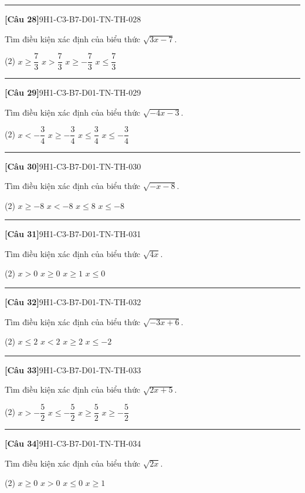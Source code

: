 \documentclass[12pt,a4paper]{article}
\newif\ifloigiai
\newenvironment{cauhoi}[2]{%
  \par\medskip\noindent\rule{\textwidth}{0.4pt}\par\nopagebreak
  \noindent\textbf{[#1]}\hfill{\scriptsize\ttfamily #2}\par\nopagebreak\smallskip}{\par}
\newcommand{\dapan}[1]{\ifloigiai\par\smallskip\noindent\textit{Đáp án:} \textbf{#1}\par\fi}
\begin{document}
\begin{cauhoi}{Câu 28}{9H1-C3-B7-D01-TN-TH-028}
Tìm điều kiện xác định của biểu thức $\sqrt{3x - 7}$.
\begin{tasks}(2)
\task $x\ge \dfrac{7}{3}$
\task $x>\dfrac{7}{3}$
\task $x\ge -\dfrac{7}{3}$
\task $x\le \dfrac{7}{3}$
\end{tasks}
\dapan{A}
\end{cauhoi}
\begin{cauhoi}{Câu 29}{9H1-C3-B7-D01-TN-TH-029}
Tìm điều kiện xác định của biểu thức $\sqrt{-4x - 3}$.
\begin{tasks}(2)
\task $x<-\dfrac{3}{4}$
\task $x\ge -\dfrac{3}{4}$
\task $x\le \dfrac{3}{4}$
\task $x\le -\dfrac{3}{4}$
\end{tasks}
\dapan{D}
\end{cauhoi}
\begin{cauhoi}{Câu 30}{9H1-C3-B7-D01-TN-TH-030}
Tìm điều kiện xác định của biểu thức $\sqrt{-x - 8}$.
\begin{tasks}(2)
\task $x\ge -8$
\task $x<-8$
\task $x\le 8$
\task $x\le -8$
\end{tasks}
\dapan{D}
\end{cauhoi}
\begin{cauhoi}{Câu 31}{9H1-C3-B7-D01-TN-TH-031}
Tìm điều kiện xác định của biểu thức $\sqrt{4x}$.
\begin{tasks}(2)
\task $x>0$
\task $x\ge 0$
\task $x\ge 1$
\task $x\le 0$
\end{tasks}
\dapan{B}
\end{cauhoi}
\begin{cauhoi}{Câu 32}{9H1-C3-B7-D01-TN-TH-032}
Tìm điều kiện xác định của biểu thức $\sqrt{-3x + 6}$.
\begin{tasks}(2)
\task $x\le 2$
\task $x<2$
\task $x\ge 2$
\task $x\le -2$
\end{tasks}
\dapan{A}
\end{cauhoi}
\begin{cauhoi}{Câu 33}{9H1-C3-B7-D01-TN-TH-033}
Tìm điều kiện xác định của biểu thức $\sqrt{2x + 5}$.
\begin{tasks}(2)
\task $x>-\dfrac{5}{2}$
\task $x\le -\dfrac{5}{2}$
\task $x\ge \dfrac{5}{2}$
\task $x\ge -\dfrac{5}{2}$
\end{tasks}
\dapan{D}
\end{cauhoi}
\begin{cauhoi}{Câu 34}{9H1-C3-B7-D01-TN-TH-034}
Tìm điều kiện xác định của biểu thức $\sqrt{2x}$.
\begin{tasks}(2)
\task $x\ge 0$
\task $x>0$
\task $x\le 0$
\task $x\ge 1$
\end{tasks}
\dapan{A}
\end{cauhoi}
\end{document}
